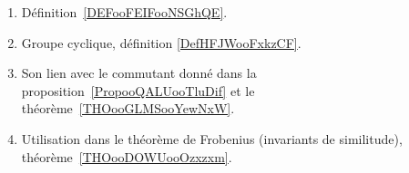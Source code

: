 
	\label{THEMEooEndoCycliques}
\begin{enumerate}
	\item
	      Définition~\ref{DEFooFEIFooNSGhQE}.
	\item
	      Groupe cyclique, définition \ref{DefHFJWooFxkzCF}.
	\item
	      Son lien avec le commutant donné dans la proposition~\ref{PropooQALUooTluDif} et le théorème~\ref{THOooGLMSooYewNxW}.
	\item
	      Utilisation dans le théorème de Frobenius (invariants de similitude), théorème~\ref{THOooDOWUooOzxzxm}.
\end{enumerate}
